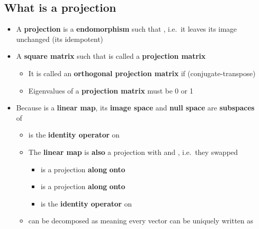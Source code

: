 \subsection*{What is a projection}

\begin{itemize}

  \item
        A \textbf{projection}  is a \textbf{endomorphism}
        such that \iMbox{\pi \circ \pi = \pi}, i.e.~it leaves its image
        unchanged (its idempotent)
  \item
        A \textbf{square matrix}  such that  is called
        a \textbf{projection matrix}

        \begin{itemize}

          \item
                It is called an \textbf{orthogonal projection matrix} if
                 (conjugate-transpose)
          \item
                Eigenvalues of a \textbf{projection matrix} must be 0 or 1
        \end{itemize}
  \item
        Because  is a \textbf{linear map}, its
        \textbf{image space}  and \textbf{null
          space}  are \textbf{subspaces} of

        \begin{itemize}

          \item
                \iMbox{\pi} is the \textbf{identity operator} on 
          \item
                The \textbf{linear map}  is
                \textbf{also} a projection with
                 and
                , i.e.~they
                swapped

                \begin{itemize}

                  \item
                        \iMbox{\pi} is a projection \textbf{along}  \textbf{onto}
                  \item
                        \iMbox{\pi^{*}} is a projection \textbf{along} 
                        \textbf{onto} 
                  \item
                        \iMbox{\pi^{*}} is the \textbf{identity operator} on 
                \end{itemize}
          \item
                 can be decomposed as  meaning every
                vector  can be uniquely written as 


\end{itemize}
\end{itemize}
